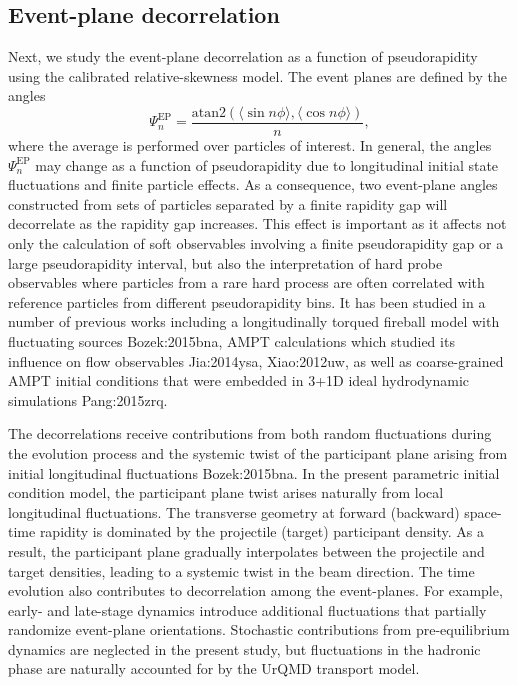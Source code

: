 \subsection{Event-plane decorrelation}

Next, we study the event-plane decorrelation as a function of pseudorapidity using the calibrated relative-skewness model. 
The event planes are defined by the angles
\begin{equation}
  \Psi_n^\text{EP} = \frac{\text{atan2}(\langle \sin n \phi \rangle, \langle\cos n \phi \rangle)}{n},
\end{equation}
where the average is performed over particles of interest.
In general, the angles $\Psi_n^\text{EP}$ may change as a function of pseudorapidity due to longitudinal initial state fluctuations and finite particle effects.
As a consequence, two event-plane angles constructed from sets of particles separated by a finite rapidity gap will decorrelate as the rapidity gap increases.
This effect is important as it affects not only the calculation of soft observables involving a finite pseudorapidity gap or a large pseudorapidity interval, but also the interpretation of hard probe observables where particles from a rare hard process are often correlated with reference particles from different pseudorapidity bins.
It has been studied in a number of previous works including a longitudinally torqued fireball model with fluctuating sources {Bozek:2015bna}, AMPT calculations which studied its influence on flow observables {Jia:2014ysa, Xiao:2012uw}, as well as coarse-grained AMPT initial conditions that were embedded in 3+1D ideal hydrodynamic simulations {Pang:2015zrq}.

The decorrelations receive contributions from both random fluctuations during the evolution process and the systemic twist of the participant plane arising from initial longitudinal fluctuations {Bozek:2015bna}.
In the present parametric initial condition model, the participant plane twist arises naturally from local longitudinal fluctuations.
The transverse geometry at forward (backward) space-time rapidity is dominated by the projectile (target) participant density.
As a result, the participant plane gradually interpolates between the projectile and target densities, leading to a systemic twist in the beam direction.
The time evolution also contributes to decorrelation among the event-planes.
For example, early- and late-stage dynamics introduce additional fluctuations that partially randomize event-plane orientations.
Stochastic contributions from pre-equilibrium dynamics are neglected in the present study, but fluctuations in the hadronic phase are naturally accounted for by the UrQMD transport model.

